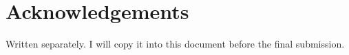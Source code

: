 \chapter*{Acknowledgements}
{\singlespacing

Written separately. I will copy it into this document before the final submission.
}